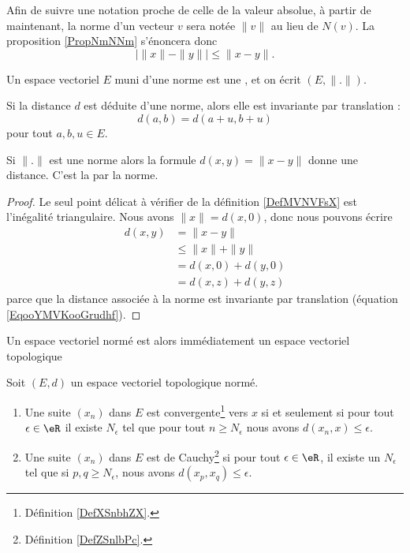 Afin de suivre une notation proche de celle de la valeur absolue, à partir de maintenant, la norme d'un vecteur $v$ sera notée $\| v\|$ au lieu de $N(v)$. La proposition \ref{PropNmNNm} s'énoncera donc
\begin{equation}
\big| \| x \|-\| y \| \big|\leq \| x-y \|.
\end{equation}
\begin{definition}		\label{DefEVNetDistance}
	Un espace vectoriel $E$ muni d'une norme est une , et on écrit $(E,\| . \|)$. 
\end{definition}

Si la distance \( d\) est déduite d'une norme, alors elle est invariante par translation :
\begin{equation}    \label{EqooYMVKooGrudhf}
    d(a,b)=d(a+u,b+u)
\end{equation}
pour tout \( a,b,u\in E\).

\begin{lemmaDef}
    Si \( \| . \|\) est une norme alors la formule \( d(x,y)=\| x-y \|\) donne une distance. C'est la  par la norme.
\end{lemmaDef}

\begin{proof}
    Le seul point délicat à vérifier de la définition \ref{DefMVNVFsX} est l'inégalité triangulaire. Nous avons \( \| x \|=d(x,0)\), donc nous pouvons écrire
    \begin{subequations}
        \begin{align}
            d(x,y)&=\| x-y \|\\
            &\leq\| x \|+\| y \|\\
            &=d(x,0)+d(y,0)\\
            &=d(x,z)+d(y,z)
        \end{align}
    \end{subequations}
    parce que la distance associée à la norme est invariante par translation (équation \eqref{EqooYMVKooGrudhf}).
\end{proof}

Un espace vectoriel normé est alors immédiatement un espace vectoriel topologique
\begin{proposition}     \label{PropooUEEOooLeIImr}
    Soit \( (E,d)\) un espace vectoriel topologique normé.
    \begin{enumerate}
        \item   \label{ItemooROYMooAQCXnj}
            Une suite \( (x_n)\) dans \( E\) est convergente\footnote{Définition \ref{DefXSnbhZX}.} vers \( x\) si et seulement si pour tout \( \epsilon\in \eR\) il existe \( N_{\epsilon}\) tel que pour tout \( n\geq N_{\epsilon}\) nous avons \( d(x_n,x)\leq \epsilon\).
        \item
            Une suite \( (x_n)\) dans \( E\) est de Cauchy\footnote{Définition \ref{DefZSnlbPc}.} si pour tout \( \epsilon\in \eR\), il existe un \( N_{\epsilon}\) tel que si \( p,q\geq N_{\epsilon}\), nous avons \( d(x_p,x_q)\leq \epsilon\).
    \end{enumerate}
\end{proposition}

